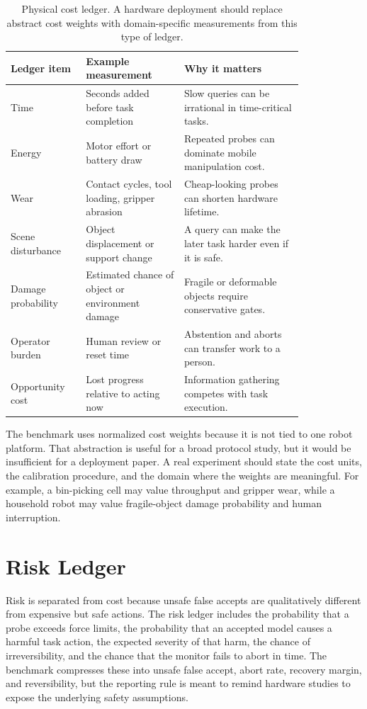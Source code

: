 \documentclass{article}
\begin{document}
\begin{table}[p]
\centering
\small
\begin{tabular}{p{0.19\linewidth}p{0.29\linewidth}p{0.34\linewidth}}
\toprule
Ledger item & Example measurement & Why it matters \\
\midrule
Time & Seconds added before task completion & Slow queries can be irrational in time-critical tasks. \\
Energy & Motor effort or battery draw & Repeated probes can dominate mobile manipulation cost. \\
Wear & Contact cycles, tool loading, gripper abrasion & Cheap-looking probes can shorten hardware lifetime. \\
Scene disturbance & Object displacement or support change & A query can make the later task harder even if it is safe. \\
Damage probability & Estimated chance of object or environment damage & Fragile or deformable objects require conservative gates. \\
Operator burden & Human review or reset time & Abstention and aborts can transfer work to a person. \\
Opportunity cost & Lost progress relative to acting now & Information gathering competes with task execution. \\
\bottomrule
\end{tabular}
\caption{Physical cost ledger. A hardware deployment should replace abstract cost weights with domain-specific measurements from this type of ledger.}
\label{tab:cost_ledger}
\end{table}

The benchmark uses normalized cost weights because it is not tied to one robot platform. That abstraction is useful for a broad protocol study, but it would be insufficient for a deployment paper. A real experiment should state the cost units, the calibration procedure, and the domain where the weights are meaningful. For example, a bin-picking cell may value throughput and gripper wear, while a household robot may value fragile-object damage probability and human interruption.

\section{Risk Ledger}

Risk is separated from cost because unsafe false accepts are qualitatively different from expensive but safe actions. The risk ledger includes the probability that a probe exceeds force limits, the probability that an accepted model causes a harmful task action, the expected severity of that harm, the chance of irreversibility, and the chance that the monitor fails to abort in time. The benchmark compresses these into unsafe false accept, abort rate, recovery margin, and reversibility, but the reporting rule is meant to remind hardware studies to expose the underlying safety assumptions.
\end{document}
